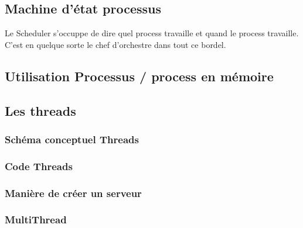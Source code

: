 \subsection{Machine d'état processus}
Le Scheduler s'occuppe de dire quel process travaille et quand le process travaille. C'est en quelque sorte le chef d'orchestre dans tout ce bordel.

\subsection{Utilisation Processus / process en mémoire}
\subsection{Les threads}

\subsubsection{Schéma conceptuel Threads}

\subsubsection{Code Threads}

\subsubsection{Manière de créer un serveur }

\subsubsection{MultiThread}

